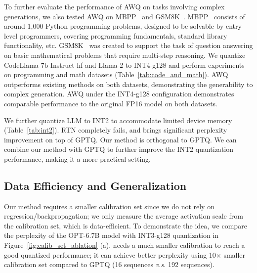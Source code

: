 To further evaluate the performance of AWQ on tasks involving complex generations, we also tested AWQ on MBPP~\cite{austin2021program} and GSM8K~\cite{cobbe2021training}. MBPP~\cite{austin2021program} consists of around 1,000 Python programming problems, designed to be solvable by entry level programmers, covering programming fundamentals, standard library functionality, etc. GSM8K~\cite{cobbe2021training} was created to support the task of question answering on basic mathematical problems that require multi-step reasoning. We quantize CodeLlama-7b-Instruct-hf and Llama-2 to INT4-g128 and perform experiments on programming and math datasets (Table~\ref{tab:code_and_math}). AWQ outperforms existing methods on both datasets, demonstrating the generability to complex generation. AWQ under the INT4-g128 configuration demonstrates comparable
performance to the original FP16 model on both datasets.


We further quantize LLM to INT2 to accommodate limited device memory (Table~\ref{tab:int2}). RTN completely fails, and \methodshort brings significant perplexity improvement on top of GPTQ.%
Our method is orthogonal to GPTQ.
We can combine our method with GPTQ to further improve the INT2 quantization performance, making it a more practical setting. 

\subsection{Data Efficiency and Generalization}
\label{sec:ablation_study}
 Our method requires a smaller calibration set since we do not rely on regression/backpropagation; we only measure the average activation scale from the calibration set, which is data-efficient.
To demonstrate the idea, we compare the perplexity of the OPT-6.7B model with INT3-g128 quantization in Figure~\ref{fig:calib_set_ablation} (a). \methodshort needs a much smaller calibration to reach a good quantized performance; it can achieve better perplexity using 10$\times$ smaller calibration set compared to GPTQ (16 sequences \emph{v.s.} 192 sequences).

